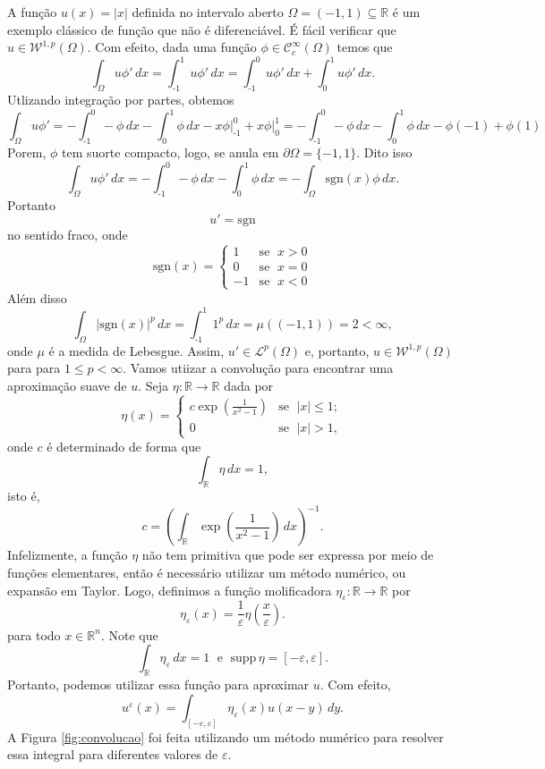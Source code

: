 \documentclass[a4paper, 11pt]{book}
\theoremstyle{definition}
\newcommand{\m}{\text{-}}
\newcommand{\bR}{\mathbb{R}}
\newcommand{\cC}{\mathcal{C}}
\newcommand{\cL}{\mathcal{L}}
\newcommand{\cW}{\mathcal{W}}
\newcommand{\supp}{\mathrm{supp}\,}
\newcommand{\sgn}{\mathrm{sgn}}
\begin{document}
\begin{ex}
    A função $u(x) = |x|$ definida no intervalo aberto $\Omega = (-1,1) \subseteq \bR$ é um exemplo clássico de função que não é diferenciável. É fácil verificar que $u \in \cW^{1,p}(\Omega)$. Com efeito, dada uma função $\phi \in \cC^\infty_c(\Omega)$ temos que
    \[
        \int_\Omega u \phi' \,dx = \int_{\text{-}1}^1 u \phi' \,dx = \int_{\text{-}1}^0 u \phi' \,dx + \int_0^1 u \phi' \,dx.
    \]
    Utlizando integração por partes, obtemos
    \[
        \int_\Omega u \phi' =  - \int_{\m1}^0 -\phi \,dx  - \int_0^1 \phi \,dx -x \phi \bigg|^{0}_{\m1}+ x\phi \bigg|_0^1 = -\int_{\m1}^{0} - \phi \,dx -\int_0^1 \phi \,dx - \phi(-1) + \phi(1)
    \]
    Porem, $\phi$ tem suorte compacto, logo, se anula em $\partial\Omega = \{-1,1\}$. Dito isso
    \[
        \int_\Omega u \phi'\,dx = - \int_{\text{-}1}^0 -\phi \,dx - \int_0^1 \phi \,dx = -\int_\Omega \sgn(x)\phi \,dx.
    \]
    Portanto
    \[
        u'= \sgn
    \]
    no sentido fraco, onde
    \[
        \sgn(x) = 
        \left\{ 
            \begin{array}{rr}
                1 & \text{se }\; x > 0\\
                0 & \text{se }\; x = 0\\
                -1& \text{se }\; x < 0
            \end{array}
        \right.
    \]
    Além disso
    \[
        \int_\Omega |\sgn(x)|^p \,dx = \int_{\text{-}1}^1 1^p \,dx =  \mu((-1,1)) = 2 < \infty,
    \]
    onde $\mu$ é a medida de Lebesgue. Assim, $u'\in \cL^p(\Omega)$ e, portanto, $u \in \cW^{1,p}(\Omega)$ para para $1 \leqslant p < \infty$.
    Vamos utiizar a convolução para encontrar uma aproximação suave de $u$. 
    Seja $\eta : \bR \to \bR$ dada por
    \[
        \eta(x) = \left\{ 
            \begin{array}{lr}
                c \exp\left(\frac{1}{x^2 - 1} \right) & \text{se }\; |x| \leqslant 1;\\
                0 & \text{se }\; |x| > 1,
            \end{array}
        \right.
    \]
    onde $c$ é determinado de forma que
    \[
        \int_{\bR} \eta \,dx = 1,
    \]
    isto é,
    \[
        c = \left( \int_\bR \exp \left(\frac{1}{x^2 - 1} \right) \, dx\right)^{-1}.
    \]
    Infelizmente, a função $\eta$ não tem primitiva que pode ser expressa por meio de funções elementares, então é necessário utilizar um método numérico, ou expansão em Taylor.
    Logo, definimos a função molificadora $\eta_\varepsilon : \bR \to \bR$ por
    \[
        \eta_\varepsilon(x) = \frac{1}{\varepsilon} \eta\left( \frac{x}{\varepsilon} \right).
    \]
    para todo $x \in \bR^n$. Note que
    \[
        \int_\bR \eta_\varepsilon \, dx = 1 \;\text{ e }\; \supp \eta = [-\varepsilon,\varepsilon].
    \]
    Portanto, podemos utilizar essa função para aproximar $u$. Com efeito,
    \[
        u^\varepsilon(x) = \int_{[-\varepsilon,\varepsilon]} \eta_\varepsilon(x) u(x-y) \,dy.
    \]
    A Figura \ref{fig:convolucao} foi feita utilizando um método numérico para resolver essa integral para diferentes valores de $\varepsilon$.


\end{ex}
\end{document}

